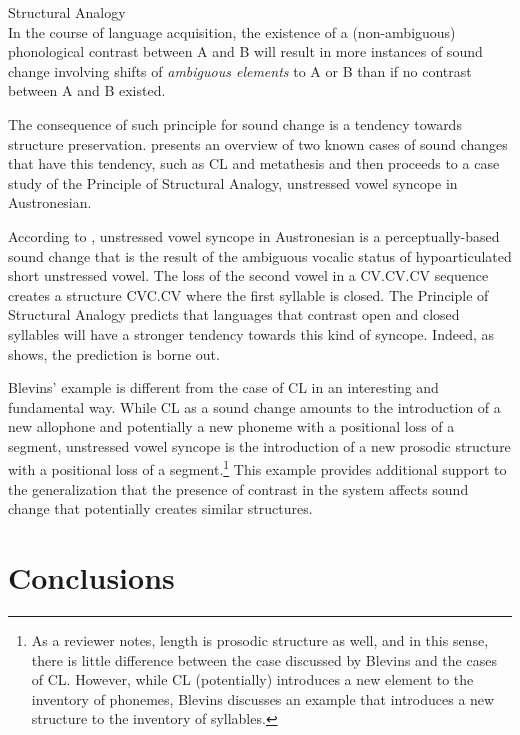 \documentclass[output=paper,
modfonts
]{LSP/langsci}
\begin{document}
\ea\label{ex:analogy}Structural Analogy \citep[154]{blevins2004a}\\
In the course of language acquisition, the existence of a
(non-ambiguous) phonological contrast between A and B will result in
more instances of sound change involving shifts of \emph{ambiguous elements} to A or B than if no contrast between A and B existed.
\z

The consequence of such principle for sound change is a tendency towards
structure preservation. \citet{blevins2009k} presents an overview of two known
cases of sound changes that have this tendency, such as CL \citep{deChene1979,kavitskaya2002} and metathesis \citep{blevins1998,blevins2004a,blevins2004d,hume2004} and then proceeds to a case study
of the Principle of Structural Analogy, unstressed vowel syncope in
Austronesian.

According to \citet{blevins2009k}, unstressed vowel syncope in Austronesian is
a perceptually-based sound change that is the result of the ambiguous
vocalic status of hypoarticulated short unstressed vowel. The loss of
the second vowel in a CV.CV.CV sequence creates a structure CVC.CV where
the first syllable is closed. The Principle of Structural Analogy
predicts that languages that contrast open and closed syllables will
have a stronger tendency towards this kind of syncope. Indeed, as
\citet{blevins2009k} shows, the prediction is borne out.

Blevins' \citeyearpar{blevins2009k} example is different from the case of CL in an
interesting and fundamental way. While CL as a sound change amounts to
the introduction of a new allophone and potentially a new phoneme with a
positional loss of a segment, unstressed vowel syncope is the
introduction of a new prosodic structure with a positional loss of a
segment.\footnote{As a reviewer notes, length is prosodic structure as
  well, and in this sense, there is little difference between the case
  discussed by Blevins and the cases of CL. However, while CL
  (potentially) introduces a new element to the inventory of phonemes,
  Blevins discusses an example that introduces a new structure to the
  inventory of syllables.} This example provides additional support to
the generalization that the presence of contrast in the system affects
sound change that potentially creates similar structures.

\section{Conclusions}
\end{document}
